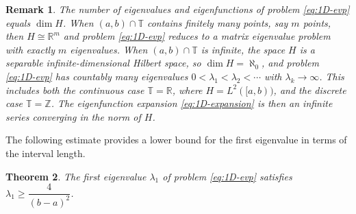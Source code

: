 \documentclass{article}
\newtheorem{theorem}{Theorem}[section]
\newtheorem{remark}[theorem]{Remark}
\numberwithin{equation}{section}
\numberwithin{theorem}{section}
\begin{document}
\begin{remark}\label{rem:dimension}
The number of eigenvalues and eigenfunctions of problem \eqref{eq:1D-evp} equals $\dim H$. When $(a,b) \cap \mathbb{T}$ contains finitely many points, say $m$ points, then $H \cong \mathbb{R}^m$ and problem \eqref{eq:1D-evp} reduces to a matrix eigenvalue problem with exactly $m$ eigenvalues. When $(a,b) \cap \mathbb{T}$ is infinite, the space $H$ is a separable infinite-dimensional Hilbert space, so $\dim H = \aleph_0$, and problem \eqref{eq:1D-evp} has countably many eigenvalues $0 < \lambda_1 < \lambda_2 < \cdots$ with $\lambda_k \to \infty$. This includes both the continuous case $\mathbb{T} = \mathbb{R}$, where $H = L^2([a,b))$, and the discrete case $\mathbb{T} = \mathbb{Z}$. The eigenfunction expansion \eqref{eq:1D-expansion} is then an infinite series converging in the norm of $H$.
\end{remark}

The following estimate provides a lower bound for the first eigenvalue in terms of the interval length.

\begin{theorem}\label{thm:lambda1-bound}
The first eigenvalue $\lambda_1$ of problem \eqref{eq:1D-evp} satisfies
$\lambda_1 \geq \dfrac{4}{(b-a)^2}$.
\end{theorem}
\end{document}
